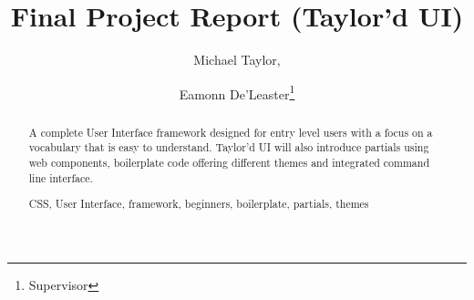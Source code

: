 \documentclass[12pt, runningheads,a4paper]{llncs}
\newcommand{\keywords}[1]{\par\addvspace\baselineskip
\noindent\keywordname\enspace\ignorespaces#1}
\begin{document}
\mainmatter  %

\title{Final Project Report (Taylor'd UI)}


%
%
\author{Michael Taylor,%
\and Eamonn De'Leaster\thanks{Supervisor}}
%


%
%
\maketitle

%
\begin{abstract}

A complete User Interface framework designed for entry level users with a focus on a vocabulary that is easy to understand. Taylor'd UI will also introduce partials using web components, boilerplate code offering different themes and integrated command line interface.
\keywords{CSS, User Interface, framework, beginners, boilerplate, partials, themes}
\end{abstract}
%

%
%
%
\newpage
\tableofcontents
%
\renewcommand*{\glsclearpage}{}
\printglossaries
\newpage
\listoffigures
{}
\listoftables
{}
\end{document}
